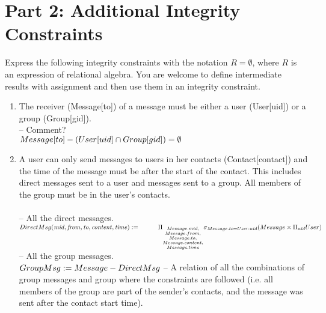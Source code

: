 \documentclass{article}
\newcommand{\var}[1]{\mathit{#1}}
\begin{document}
\section*{Part 2: Additional Integrity Constraints}


Express the following integrity constraints
with the notation $R = \emptyset$, where $R$ is an expression of relational algebra. 
You are welcome to define intermediate results with assignment
and then use them in an integrity constraint.

\begin{enumerate}

\item   %
The receiver (Message[to]) of a message must be either a user (User[uid]) or a group (Group[gid]). \\ [5pt]
\large{
\hspace*{1cm} -- Comment?\\ [5pt]
$
Message[to] - (User[uid] \cap Group[gid]) =  \emptyset \\[5pt]
$
}
\item %
A user can only send messages to users in her contacts (Contact[contact]) and the time of the message must be after the start of the contact. This includes direct messages sent to a user and messages sent to a group. All members of the group must be in the user's contacts. \\\\ [5pt]
\large{
\hspace*{1cm} -- All the direct messages. \\ [5pt]
$
DirectMsg(\var{mid}, \var{from}, \var{to}, \var{content}, \var{time}) := \\ [5pt]
\hspace*{1cm} \Pi_{\substack{Message.mid, \\
							Message.from, \\
							Message.to, \\
							Message.content, \\
							Message.time}}
			\sigma_{Message.to = User.uid}
			(Message \times \Pi_{\var{uid}} User) \\\\\\ [5pt]
$
\hspace*{1cm} -- All the group messages. \\ [5pt]
$
GroupMsg := Message - DirectMsg \\\\ [5pt]
$
\hspace*{1cm} -- A relation of all the combinations of group messages and group where the constraints are followed (i.e. all members of the group are part of the sender's contacts, and the message was sent after the contact start time). \\ [5pt]
}
\end{enumerate}
\end{document}

